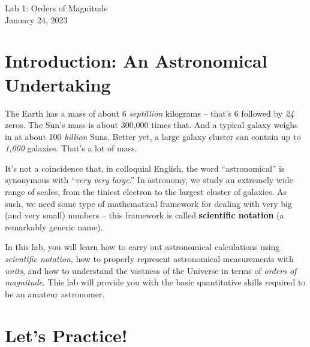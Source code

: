 \documentclass[11pt]{article}
\begin{document}
\begin{center}
\huge{Lab 1: Orders of Magnitude}\\ \medskip \Large{January 24, 2023}
\end{center}


\section{Introduction: An Astronomical Undertaking}

The Earth has a mass of about 6 \emph{septillion} kilograms -- that's 6 followed by \emph{24} zeros. The Sun's mass is about 300,000 times that. And a typical galaxy weighs in at about 100 \emph{billion} Suns. Better yet, a large galaxy cluster can contain up to \emph{1,000} galaxies. That's a lot of mass.

\medskip \noindent
It's not a coincidence that, in colloquial English, the word ``astronomical'' is synonymous with ``\emph{very very large}.'' In astronomy, we study an extremely wide range of scales, from the tiniest electron to the largest cluster of galaxies. As such, we need some type of mathematical framework for dealing with very big (and very small) numbers -- this framework is called \textbf{scientific notation} (a remarkably generic name). 

\medskip \noindent
In this lab, you will learn how to carry out astronomical calculations using \emph{scientific notation}, how to properly represent astronomical measurements with \emph{units}, and how to understand the vastness of the Universe in terms of \emph{orders of magnitude}. This lab will provide you with the basic quantitative skills required to be an amateur astronomer.

\bigskip


\section{Let's Practice!}
\end{document}
